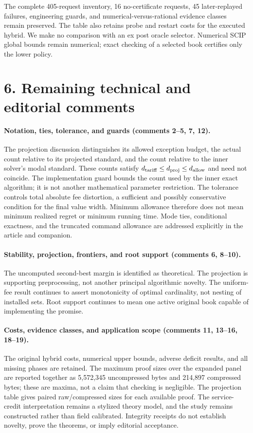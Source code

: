The complete 405-request inventory, 16 no-certificate requests, 45 later-replayed failures, engineering guards, and numerical-versus-rational evidence classes remain preserved. The table also retains probe and restart costs for the executed hybrid. We make no comparison with an ex post oracle selector. Numerical SCIP global bounds remain numerical; exact checking of a selected book certifies only the lower policy.

\section*{6. Remaining technical and editorial comments}
\paragraph{Notation, ties, tolerance, and guards (comments 2--5, 7, 12).}
The projection discussion distinguishes its allowed exception budget, the actual count relative to its projected standard, and the count relative to the inner solver's modal standard. These counts satisfy $d_{\rm tariff}\leq d_{\rm proj}\leq d_{\rm allow}$ and need not coincide. The implementation guard bounds the count used by the inner exact algorithm; it is not another mathematical parameter restriction. The tolerance controls total absolute fee distortion, a sufficient and possibly conservative condition for the final value width. Minimum allowance therefore does not mean minimum realized regret or minimum running time. Mode ties, conditional exactness, and the truncated command allowance are addressed explicitly in the article and companion.

\paragraph{Stability, projection, frontiers, and root support (comments 6, 8--10).}
The uncomputed second-best margin is identified as theoretical. The projection is supporting preprocessing, not another principal algorithmic novelty. The uniform-fee result continues to assert monotonicity of optimal cardinality, not nesting of installed sets. Root support continues to mean one active original book capable of implementing the promise.

\paragraph{Costs, evidence classes, and application scope (comments 11, 13--16, 18--19).}
The original hybrid costs, numerical upper bounds, adverse deficit results, and all missing phases are retained. The maximum proof sizes over the expanded panel are reported together as 5,572,345 uncompressed bytes and 214,897 compressed bytes; these are maxima, not a claim that checking is negligible. The projection table gives paired raw/compressed sizes for each available proof. The service-credit interpretation remains a stylized theory model, and the study remains constructed rather than field calibrated. Integrity receipts do not establish novelty, prove the theorems, or imply editorial acceptance.


